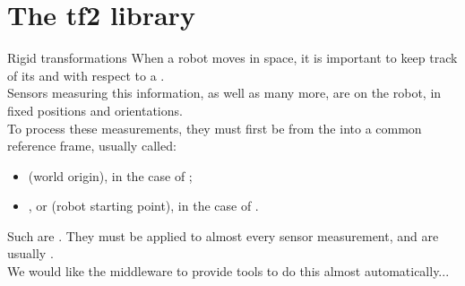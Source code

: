 
\section{The tf2 library}
\graphicspath{{figs/section5/}}

\begin{frame}{Rigid transformations}
	When a robot moves in space, it is important to keep track of its  and  with respect to a .\\
	\bigskip
	Sensors measuring this information, as well as many more, are  on the robot, in fixed positions and orientations.\\
	\bigskip
	To process these measurements, they must first be  from the  into a common reference frame, usually called:
	\begin{itemize}
		\item {} (world origin), in the case of ;
		\item {}, or  (robot starting point), in the case of .
	\end{itemize}
	\medskip
	Such  are . They must be applied to almost every sensor measurement, and are usually .\\
	\bigskip
	We would like the middleware to provide tools to do this almost automatically...
\end{frame}


